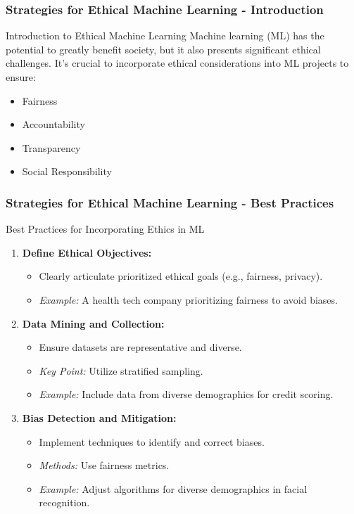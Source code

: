 \documentclass[aspectratio=169]{beamer}
\begin{document}
\begin{frame}[fragile]
    \frametitle{Strategies for Ethical Machine Learning - Introduction}
    \begin{block}{Introduction to Ethical Machine Learning}
        Machine learning (ML) has the potential to greatly benefit society, but it also presents significant ethical challenges. It's crucial to incorporate ethical considerations into ML projects to ensure:
        \begin{itemize}
            \item Fairness
            \item Accountability
            \item Transparency
            \item Social Responsibility
        \end{itemize}
    \end{block}
\end{frame}

\begin{frame}[fragile]
    \frametitle{Strategies for Ethical Machine Learning - Best Practices}
    \begin{block}{Best Practices for Incorporating Ethics in ML}
        \begin{enumerate}
            \item \textbf{Define Ethical Objectives:}
                \begin{itemize}
                    \item Clearly articulate prioritized ethical goals (e.g., fairness, privacy).
                    \item \textit{Example:} A health tech company prioritizing fairness to avoid biases.
                \end{itemize}
                
            \item \textbf{Data Mining and Collection:}
                \begin{itemize}
                    \item Ensure datasets are representative and diverse.
                    \item \textit{Key Point:} Utilize stratified sampling.
                    \item \textit{Example:} Include data from diverse demographics for credit scoring.
                \end{itemize}

            \item \textbf{Bias Detection and Mitigation:}
                \begin{itemize}
                    \item Implement techniques to identify and correct biases.
                    \item \textit{Methods:} Use fairness metrics.
                    \item \textit{Example:} Adjust algorithms for diverse demographics in facial recognition.
                \end{itemize}
        \end{enumerate}
    \end{block}
\end{frame}
\end{document}
